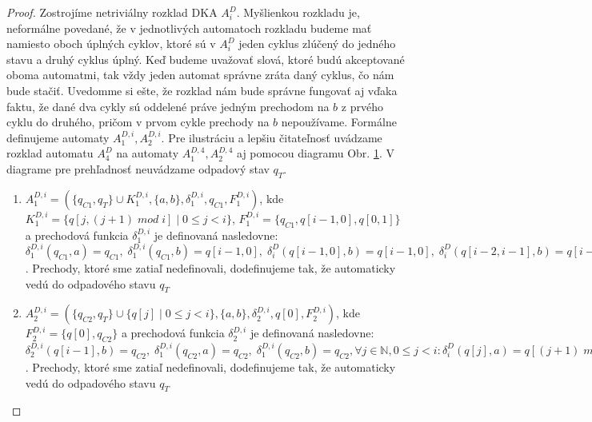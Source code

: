 \begin{proof}
Zostrojíme netriviálny rozklad DKA $ A_i^D $. Myšlienkou rozkladu je, neformálne povedané, že v jednotlivých automatoch rozkladu budeme mať namiesto oboch úplných cyklov, ktoré sú v $ A_i^D $ jeden cyklus \glqq{}zlúčený\grqq{} do jedného stavu a druhý cyklus úplný. Keď budeme uvažovať slová, ktoré budú akceptované oboma automatmi, tak vždy jeden automat správne zráta daný cyklus, čo nám bude stačiť. Uvedomme si ešte, že rozklad nám bude správne fungovať aj vďaka faktu, že dané dva cykly sú oddelené práve jedným prechodom na $ b $ z prvého cyklu do druhého, pričom v prvom cykle prechody na $ b $ nepoužívame. Formálne definujeme automaty $ A_1^{D,i}, A_2^{D,i} $. Pre ilustráciu a lepšiu čitateľnosť uvádzame rozklad automatu $ A_4^D $ na automaty $ A_1^{D,4}, A_2^{D,4} $ aj pomocou diagramu Obr. \ref{fig:ndet_vs_det_diff_big_DFA_dec}. V diagrame pre prehľadnosť neuvádzame odpadový stav $ q_T $.
\begin{enumerate}
\item $ A_1^{D,i} = (\lbrace q_{C1}, q_T \rbrace \cup K_1^{D,i}, \lbrace a,b \rbrace, \delta_1^{D,i}, q_{C1}, F_1^{D,i}) $, kde $ K_1^{D,i} = \lbrace q[j,(j+1) \; mod \; i] \; | \; 0 \leq j < i \rbrace $, $ F_1^{D,i} = \lbrace q_{C1}, q[i-1,0],q[0,1] \rbrace$ a prechodová funkcia $ \delta_1^{D,i} $ je definovaná nasledovne: $ \delta_1^{D,i}(q_{C1},a) = q_{C1}, \; \delta_1^{D,i}(q_{C1},b) = q[i-1,0], \; \delta_i^D(q[i-1,0],b) = q[i-1,0], \; \delta_i^D(q[i-2,i-1],b) = q[i-1,0], \; \forall q[j,k] \in K_1^{D,i} : \delta_i^D(q[j,k],a) = \lbrace q[(j+1) \; mod \; i, (k+1) \; mod \; i] \rbrace $. Prechody, ktoré sme zatiaľ nedefinovali, dodefinujeme tak, že automaticky vedú do odpadového stavu $ q_T $ 
\item $ A_2^{D,i} = (\lbrace q_{C2}, q_T \rbrace \cup \lbrace q[j] \; | \; 0 \leq j < i \rbrace, \lbrace a,b \rbrace, \delta_2^{D,i}, q[0], F_2^{D,i}) $, kde $ F_2^{D,i} = \lbrace q[0], q_{C2} \rbrace $ a prechodová funkcia $ \delta_2^{D,i} $ je definovaná nasledovne: $ \delta_2^{D,i}(q[i-1],b) = q_{C2}, \; \delta_1^{D,i}(q_{C2},a) = q_{C2}, \; \delta_1^{D,i}(q_{C2},b) = q_{C2}, \forall j \in \mathbb{N}, 0 \leq j < i : \delta_i^D(q[j],a) = q[(j+1) \; mod \; i] $. Prechody, ktoré sme zatiaľ nedefinovali, dodefinujeme tak, že automaticky vedú do odpadového stavu $ q_T $
\end{enumerate}

\begin{figure}[H]
\label{fig:ndet_vs_det_diff_big_DFA_dec}
\centering
{}
\end{figure}
\end{proof}
